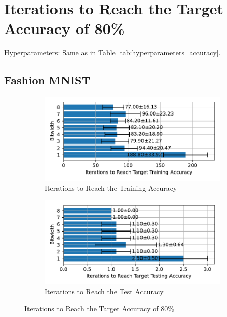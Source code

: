 \section{Iterations to Reach the Target Accuracy of 80\%}
\label{appendix:iterations}
    Hyperparameters: Same as in Table \ref{tab:hyperparameters_accuracy}.

    \subsection{Fashion MNIST}
    \label{appendix:iterations_fashion_mnist}
        \begin{figure}[H]
            \centering
            \begin{subfigure}[H]{0.6\textwidth}
                \centering
                \includegraphics[width=\textwidth]{../standard/FashionMNIST/plots/fashionmnist_train_iters_horizontal.pdf}
                \caption{Iterations to Reach the Training Accuracy}
            \end{subfigure}
            \hfill
            \begin{subfigure}[H]{0.6\textwidth}
                \centering
                \includegraphics[width=\textwidth]{../standard/FashionMNIST/plots/fashionmnist_test_iters_horizontal.pdf}
                \caption{Iterations to Reach the Test Accuracy}
            \end{subfigure}
            \caption{Iterations to Reach the Target Accuracy of 80\%}
        \end{figure}


